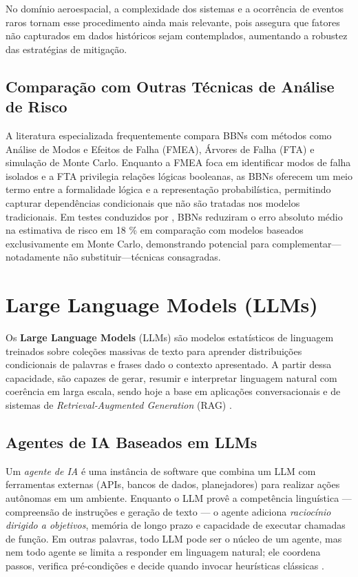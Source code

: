 No domínio aeroespacial, a complexidade dos sistemas e a ocorrência de eventos raros tornam esse procedimento ainda mais relevante, pois assegura que fatores não capturados em dados históricos sejam contemplados, aumentando a robustez das estratégias de mitigação.







\subsection{Comparação com Outras Técnicas de Análise de Risco}
A literatura especializada frequentemente compara BBNs com métodos como Análise de Modos e Efeitos de Falha (FMEA), Árvores de Falha (FTA) e simulação de Monte Carlo. Enquanto a FMEA foca em identificar modos de falha isolados e a FTA privilegia relações lógicas booleanas, as BBNs oferecem um meio termo entre a formalidade lógica e a representação probabilística, permitindo capturar dependências condicionais que não são tratadas nos modelos tradicionais. Em testes conduzidos por \cite{marcot2012future}, BBNs reduziram o erro absoluto médio na estimativa de risco em 18 \% em comparação com modelos baseados exclusivamente em Monte Carlo, demonstrando potencial para complementar—notadamente não substituir—técnicas consagradas.


\section{Large Language Models (LLMs)}
\label{sec:llms}

Os \textbf{Large Language Models} (LLMs) são modelos estatísticos de linguagem treinados sobre coleções massivas de texto para aprender distribuições condicionais de palavras e frases dado o contexto apresentado. A partir dessa capacidade, são capazes de gerar, resumir e interpretar linguagem natural com coerência em larga escala, sendo hoje a base em aplicações conversacionais e de sistemas de \emph{Retrieval‑Augmented Generation} (RAG) \cite{IBM2023LLM}.

\subsection{Agentes de IA Baseados em LLMs}
\label{subsec:agentes_llm}

Um \emph{agente de IA} é uma instância de software que combina um LLM com ferramentas externas (APIs, bancos de dados, planejadores) para realizar ações autônomas em um ambiente. Enquanto o LLM provê a competência linguística — compreensão de instruções e geração de texto — o agente adiciona \emph{raciocínio dirigido a objetivos}, memória de longo prazo e capacidade de executar chamadas de função. Em outras palavras, todo LLM pode ser o núcleo de um agente, mas nem todo agente se limita a responder em linguagem natural; ele coordena passos, verifica pré‑condições e decide quando invocar heurísticas clássicas \cite{IBM2023AGENTES}.

